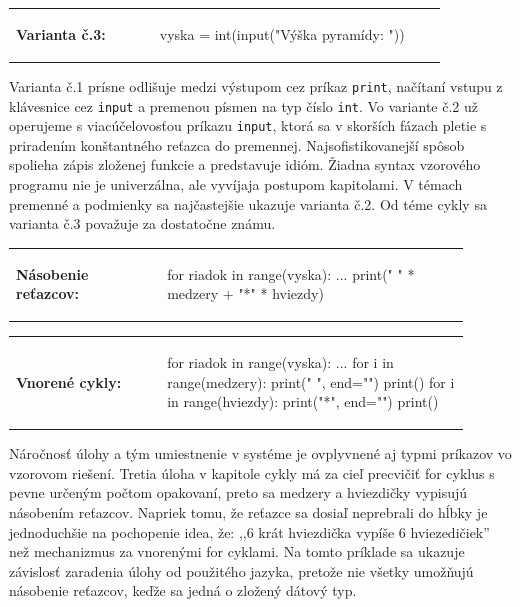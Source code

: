 \vspace{-2em}
\begin{tabular}{@{}p{0.3\linewidth}p{0.6\linewidth}}
\textbf{\small Varianta č.3:} &
\vspace{-1em}
\begin{solution}
vyska = int(input("Výška pyramídy: "))
\end{solution}
\end{tabular}

Varianta č.1 prísne odlišuje medzi výstupom cez príkaz \verb|print|, načítaní vstupu z klávesnice cez \verb|input| a premenou písmen na typ číslo \verb|int|. Vo variante č.2 už operujeme s viacúčelovosťou príkazu \verb|input|, ktorá sa v skorších fázach pletie s priradením konštantného reťazca do premennej. Najsofistikovanejší spôsob spolieha zápis zloženej funkcie a predstavuje idióm. Žiadna syntax vzorového programu nie je univerzálna, ale vyvíjaja postupom kapitolami. V témach premenné a podmienky sa najčastejšie ukazuje varianta č.2. Od téme cykly sa varianta č.3 považuje za dostatočne známu.

\begin{tabular}{@{}p{0.3\linewidth}p{0.6\linewidth}}
\textbf{\small Násobenie reťazcov:} &
\vspace{-1em}
\begin{solution}
for riadok in range(vyska):
	...
	print(" " * medzery + "*" * hviezdy)
\end{solution}
\end{tabular}

\vspace{-2em}
\begin{tabular}{@{}p{0.3\linewidth}p{0.6\linewidth}}
\textbf{\small Vnorené cykly:} &
\vspace{-1em}
\begin{solution}
for riadok in range(vyska):
	...
	for i in range(medzery):
		print(" ", end="")
	print()
	for i in range(hviezdy):
		print("*", end="")
	print()
\end{solution}
\end{tabular}

Náročnosť úlohy a tým umiestnenie v systéme je ovplyvnené aj typmi príkazov vo vzorovom riešení. Tretia úloha v kapitole cykly má za cieľ precvičiť for cyklus s pevne určeným počtom opakovaní, preto sa medzery a hviezdičky vypisujú násobením reťazcov. Napriek tomu, že reťazce sa dosiaľ neprebrali do hĺbky je jednoduchšie na pochopenie idea, že: ,,6 krát hviezdička vypíše 6 hviezedičiek'' než mechanizmus za vnorenými for cyklami. Na tomto príklade sa ukazuje závislosť zaradenia úlohy od použitého jazyka, pretože nie všetky umožňujú násobenie reťazcov, keďže sa jedná o zložený dátový typ.

